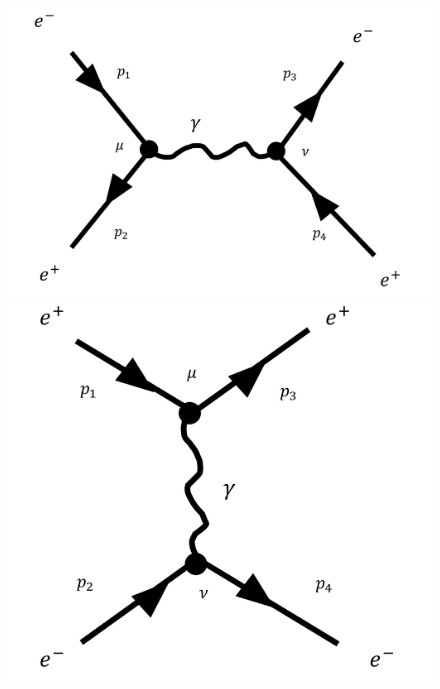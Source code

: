 \documentclass[11pt]{article}
\theoremstyle{definition}
\numberwithin{equation}{section}
\begin{document}
\begin{figure}[H]
    \centering
    \includegraphics[scale = 0.4]{bhabha s-channel annihilation creation.png}
    \includegraphics[scale = 0.4]{bhabha t-channel scattering.png}
\end{figure}

\end{document}
